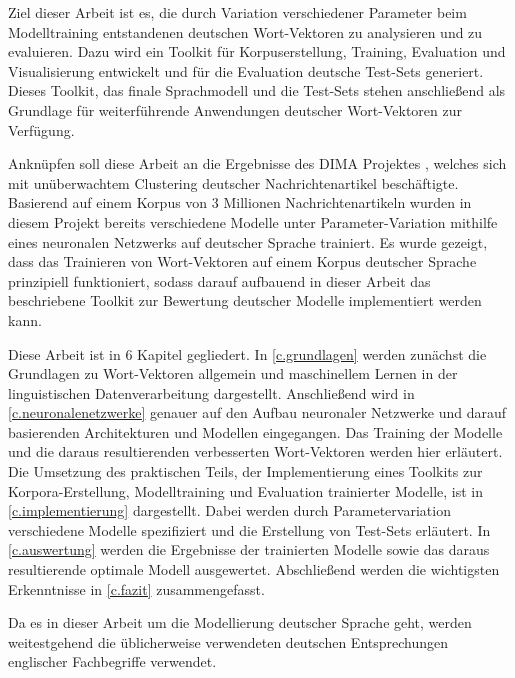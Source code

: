 Ziel dieser Arbeit ist es, die durch Variation verschiedener Parameter beim Modelltraining entstandenen deutschen Wort-Vektoren zu analysieren und zu evaluieren. Dazu wird ein Toolkit für Korpuserstellung, Training, Evaluation und Visualisierung entwickelt und für die Evaluation deutsche Test-Sets generiert. Dieses Toolkit, das finale Sprachmodell und die Test-Sets stehen anschließend als Grundlage für weiterführende Anwendungen deutscher Wort-Vektoren zur Verfügung.

Anknüpfen soll diese Arbeit an die Ergebnisse des DIMA Projektes  \citep{Arras2014}, welches sich mit unüberwachtem Clustering deutscher Nachrichtenartikel beschäftigte. Basierend auf einem Korpus von 3 Millionen Nachrichtenartikeln wurden in diesem Projekt bereits verschiedene Modelle unter Parameter-Variation mithilfe eines neuronalen Netzwerks auf deutscher Sprache trainiert. Es wurde gezeigt, dass das Trainieren von Wort-Vektoren auf einem Korpus deutscher Sprache prinzipiell funktioniert, sodass darauf aufbauend in dieser Arbeit das beschriebene Toolkit zur Bewertung deutscher Modelle implementiert werden kann.

Diese Arbeit ist in 6 Kapitel gegliedert. In \autoref{c.grundlagen} werden zunächst die Grundlagen zu Wort-Vektoren allgemein und maschinellem Lernen in der linguistischen Datenverarbeitung dargestellt. Anschließend wird in \autoref{c.neuronalenetzwerke} genauer auf den Aufbau neuronaler Netzwerke und darauf basierenden Architekturen und Modellen eingegangen. Das Training der Modelle und die daraus resultierenden verbesserten Wort-Vektoren werden hier erläutert. Die Umsetzung des praktischen Teils, der Implementierung eines Toolkits zur Korpora-Erstellung, Modelltraining und Evaluation trainierter Modelle, ist in \autoref{c.implementierung} dargestellt. Dabei werden durch Parametervariation verschiedene Modelle spezifiziert und die Erstellung von Test-Sets erläutert. In \autoref{c.auswertung} werden die Ergebnisse der trainierten Modelle sowie das daraus resultierende optimale Modell ausgewertet. Abschließend werden die wichtigsten Erkenntnisse in \autoref{c.fazit} zusammengefasst.

Da es in dieser Arbeit um die Modellierung deutscher Sprache geht, werden weitestgehend die üblicherweise verwendeten deutschen Entsprechungen englischer Fachbegriffe verwendet.


